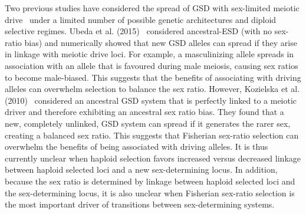\documentclass[10pt,letterpaper]{article}
\begin{document}
Two previous studies have considered the spread of GSD with sex-limited meiotic drive~\cite{Kozielska:2010vm,Ubeda:2015fx} under a limited number of possible genetic architectures and diploid selective regimes. 
Ubeda et al. (2015)~\cite{Ubeda:2015fx} considered ancestral-ESD (with no sex-ratio bias) and numerically showed that new GSD alleles can spread if they arise in linkage with meiotic drive loci. 
For example, a masculinizing allele spreads in association with an allele that is favoured during male meiosis, causing sex ratios to become male-biased.
This suggests that the benefits of associating with driving alleles can overwhelm selection to balance the sex ratio.
However, Kozielska et al. (2010)~\cite{Kozielska:2010vm} considered an ancestral GSD system that is perfectly linked to a meiotic driver and therefore exhibiting an ancestral sex ratio bias. 
They found that a new, completely unlinked, GSD system can spread if it generates the rarer sex, creating a balanced sex ratio. 
This suggests that Fisherian sex-ratio selection can overwhelm the benefits of being associated with driving alleles. 
It is thus currently unclear when haploid selection favors increased versus decreased linkage between haploid selected loci and a new sex-determining locus. 
In addition, because the sex ratio is determined by linkage between haploid selected loci and the sex-determining locus, it is also unclear when Fisherian sex-ratio selection is the most important driver of transitions between sex-determining systems. 
\end{document}
